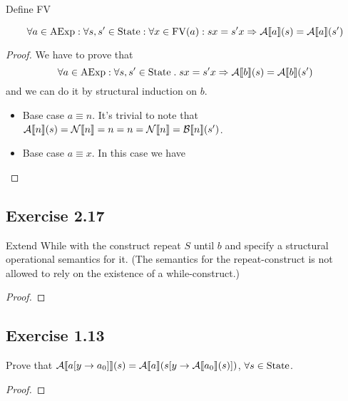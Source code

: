 \documentclass[12pt,a4paper,oneside]{book}
\begin{document}
\begin{definition}
    \label{ex_1_12_fv}
    Define FV 
\end{definition}

\begin{lemma}
    \label{ex_1_12_lemma}
    \[
    \forall a \in \mathrm{AExp} \mathrel{:} \forall s, s' \in \mathrm{State} \mathrel{:} \forall x \in \mathrm{FV}(a) \mathrel{:} sx = s'x \Rightarrow \mathcal{A} \llbracket a \rrbracket (s) = \mathcal{A} \llbracket a \rrbracket (s')
    \]

    \begin{proof}
        We have to prove that
        \[
        \forall a \in \mathrm{AExp} \mathrel{:} \forall s, s' \in \mathrm{State} \mathrel{.} sx = s'x \Rightarrow \mathcal{A} \llbracket b \rrbracket (s) = \mathcal{A} \llbracket b \rrbracket (s')
        \]
        and we can do it by structural induction on $b$.

        \begin{itemize}
            \item Base case $a \equiv n$. It's trivial to note that $\mathcal{A} \llbracket n \rrbracket (s) = \mathcal{N} \llbracket n \rrbracket = n = n = \mathcal{N} \llbracket n \rrbracket = \mathcal{B} \llbracket n \rrbracket (s')$.
            \item Base case $a \equiv x$. In this case we have
        \end{itemize}
    \end{proof}
\end{lemma}

\subsection{Exercise 2.17}
\begin{exercise}
    Extend While with the construct repeat $S$ until $b$ and specify a
    structural operational semantics for it. (The semantics for the
    repeat-construct is not allowed to rely on the existence of a
    while-construct.)

    \begin{proof}
        \prooftree
        \justifies
           \to {}
        \endprooftree
    \end{proof}
\end{exercise}

\subsection{Exercise 1.13}

\begin{exercise}
    Prove that $\mathcal{A} \llbracket  a[y \to a_0]  \rrbracket (s) = \mathcal{A} \llbracket a \rrbracket (s[y \to \mathcal{A} \llbracket a_0 \rrbracket (s)])$, $\forall s \in \mathrm{State}$.

    \begin{proof}
    \end{proof}
\end{exercise}
\end{document}
